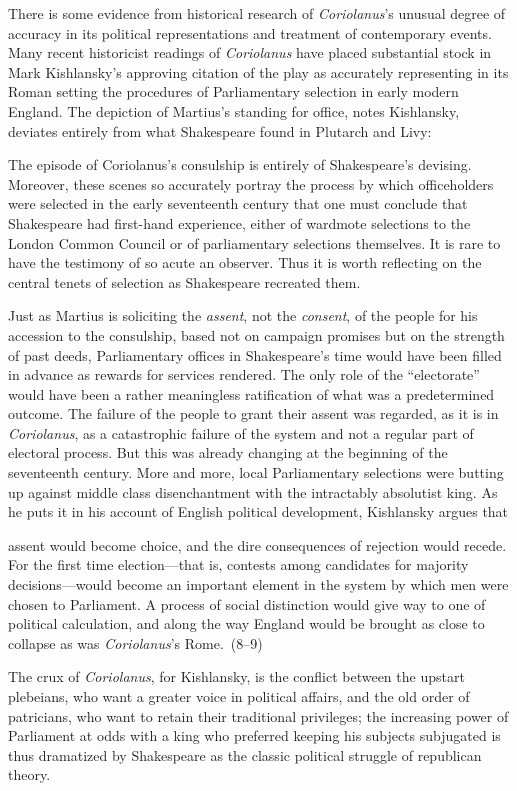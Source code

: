 There is some evidence from historical research of \emph{Coriolanus}'s unusual degree of accuracy in its political representations and treatment of contemporary events.
Many recent historicist readings of \emph{Coriolanus} have placed substantial stock in Mark Kishlansky's approving citation of the play as accurately representing in its Roman setting the procedures of Parliamentary selection in early modern England.
The depiction of Martius's standing for office, notes Kishlansky, deviates entirely from what Shakespeare found in Plutarch and Livy:
\begin{bq}
The episode of Coriolanus's consulship is entirely of Shakespeare's devising.
Moreover, these scenes so accurately portray the process by which officeholders were selected in the early seventeenth century that one must conclude that Shakespeare had first-hand experience, either of wardmote selections to the London Common Council or of parliamentary selections themselves.
It is rare to have the testimony of so acute an observer.
Thus it is worth reflecting on the central tenets of selection as Shakespeare recreated them.~\cite[5]{kishlansky_parliamentary_1986}
\end{bq}
Just as Martius is soliciting the \emph{assent}, not the \emph{consent}, of the people for his accession to the consulship, based not on campaign promises but on the strength of past deeds, Parliamentary offices in Shakespeare's time would have been filled in advance as rewards for services rendered.
The only role of the ``electorate'' would have been a rather meaningless ratification of what was a predetermined outcome.
The failure of the people to grant their assent was regarded, as it is in \emph{Coriolanus}, as a catastrophic failure of the system and not a regular part of electoral process.
But this was already changing at the beginning of the seventeenth century.
More and more, local Parliamentary selections were butting up against middle class disenchantment with the intractably absolutist king.
As he puts it in his account of English political development, Kishlansky argues that
\begin{bq}
assent would become choice, and the dire consequences of rejection would recede.
For the first time election---that is, contests among candidates for majority decisions---would become an important element in the system by which men were chosen to Parliament.
A process of social distinction would give way to one of political calculation, and along the way England would be brought as close to collapse as was \emph{Coriolanus}'s Rome.~(8--9)
\end{bq}
The crux of \emph{Coriolanus}, for Kishlansky, is the conflict between the upstart plebeians, who want a greater voice in political affairs, and the old order of patricians, who want to retain their traditional privileges; the increasing power of Parliament at odds with a king who preferred keeping his subjects subjugated is thus dramatized by Shakespeare as the classic political struggle of republican theory.

